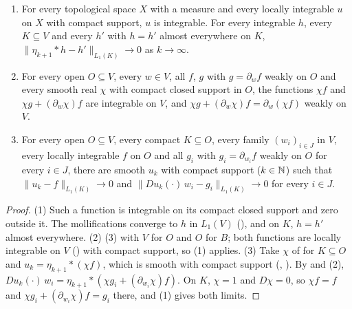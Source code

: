 \begin{lemma}
\label{lem:mollification-open-set}
\leanok
{}
\begin{enumerate}
  \item For every topological space $X$ with a measure and every locally integrable $u$ on $X$
    with compact support, $u$ is integrable. For every
    integrable $h$, every $K \subseteq V$ and every $h'$ with $h = h'$ almost everywhere on $K$,
    $\|\eta_{k+1} * h - h'\|_{L_1(K)} \to 0$ as $k \to \infty$.
  \item For every open $O \subseteq V$, every $w \in V$, all $f$, $g$ with $g = \partial_w f$
    weakly on $O$ and every smooth real $\chi$ with compact closed support in $O$, the functions
    $\chi f$ and $\chi g + (\partial_w \chi) f$ are integrable on $V$, and
    $\chi g + (\partial_w \chi) f = \partial_w (\chi f)$ weakly on $V$.
  \item For every open $O \subseteq V$, every compact $K \subseteq O$, every family
    $(w_i)_{i \in J}$ in $V$, every locally integrable $f$ on $O$ and all $g_i$ with
    $g_i = \partial_{w_i} f$ weakly on $O$ for every $i \in J$, there are smooth $u_k$ with
    compact support ($k \in \mathbb{N}$) such that $\|u_k - f\|_{L_1(K)} \to 0$ and
    $\|D u_k(\cdot) \, w_i - g_i\|_{L_1(K)} \to 0$ for every $i \in J$.
\end{enumerate}
\end{lemma}

\begin{proof}
\leanok
(1) Such a function is integrable on its compact closed support and zero outside it. The
mollifications converge to $h$ in $L_1(V)$ (), and on $K$, $h = h'$
almost everywhere. (2)  (3) with $V$ for $O$ and $O$
for $B$; both
functions are locally integrable on $V$ () with compact support,
so (1) applies. (3) Take $\chi$ of  for $K \subseteq O$ and
$u_k = \eta_{k+1} * (\chi f)$, which is smooth with compact support (,
). By  and (2),
$D u_k(\cdot) \, w_i = \eta_{k+1} * (\chi g_i + (\partial_{w_i} \chi) f)$. On $K$, $\chi = 1$ and
$D\chi = 0$, so $\chi f = f$ and $\chi g_i + (\partial_{w_i} \chi) f = g_i$ there, and (1) gives
both limits.
\end{proof}

